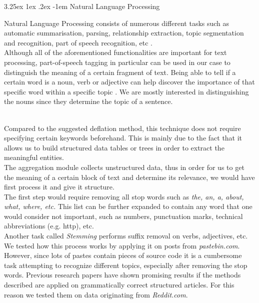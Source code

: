 \documentclass[12pt]{article}
\makeatletter
\renewcommand\paragraph{\@startsection{paragraph}{5}{\z@}%
  {3.25ex \@plus1ex \@minus.2ex}%
  {-1em}%
  {\normalfont\normalsize\bfseries}}
\makeatother
\begin{document}
\paragraph{Natural Language Processing}
\hfill \break\\
\parbox{\linewidth}{
Natural Language Processing consists of numerous different tasks such as automatic summarisation, parsing, relationship extraction, topic segmentation and recognition, part of speech recognition, etc \cite{nlp1}.
\hfill \break
\\
Although all of the aforementioned functionalities are important for text processing, part-of-speech tagging \cite{nlp2} in particular can be used in our case to distinguish the meaning of a certain fragment of text. Being able to tell if a certain word is a noun, verb or adjective can help discover the importance of that specific word within a specific topic \cite{socialweb}.  We are mostly interested in distinguishing the nouns since they determine the topic of a sentence.}
\hfill \break
\\
Compared to the suggested deflation method, this technique does not require specifying certain keywords beforehand. This is mainly due to the fact that it allows us to build structured data tables or trees in order to extract the meaningful entities. 
\hfill \break
\\
The aggregation module collects unstructured data, thus in order for us to get the meaning of a certain block of text and determine its relevance, we would have first process it and give it structure. 
\hfill \break
\\
The first step would require removing all stop words such as \textit{the, an, a, about, what, where, etc.} This list can be further expanded to contain any word that one would consider not important, such as numbers, punctuation marks, technical abbreviations (e.g. http), etc.
\hfill \break
\\
Another task called \textit{Stemming} performs suffix removal on verbs, adjectives, etc. 
\hfill \break
\\
We tested how this process works by applying it on posts from \textit{pastebin.com}. However, since lots of pastes contain pieces of source code it is a cumbersome task attempting to recognize different topics, especially after removing the stop words. Previous research papers \cite{second} have shown promising results if the methods described are applied on grammatically correct structured articles. For this reason we tested them on data originating from \textit{Reddit.com}.
\end{document}

